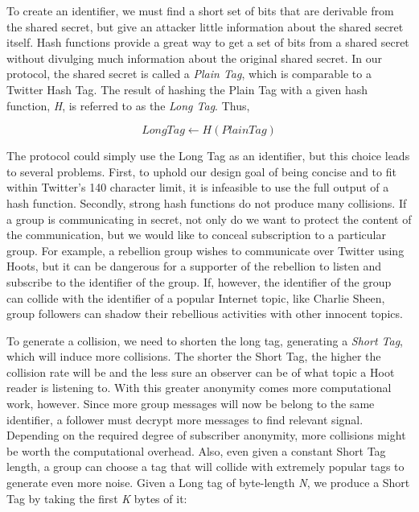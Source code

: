 \documentclass{acm_proc_article-sp}
\begin{document}
To create an identifier, we must find a short set of bits that are derivable from the shared secret, but give an attacker little information about the shared secret itself. Hash functions provide a great way to get a set of bits from a shared secret without divulging much information about the original shared secret. In our protocol, the shared secret is called a \textit{Plain Tag}, which is comparable to a Twitter Hash Tag. The result of hashing the Plain Tag with a given hash function, \textit{H}, is referred to as the \textit{Long Tag}. Thus,

\begin{equation}
	LongTag \leftarrow H(PlainTag)
\end{equation} 

The protocol could simply use the Long Tag as an identifier, but this choice leads to several problems. First, to uphold our design goal of being concise and to fit within Twitter's 140 character limit, it is infeasible to use the full output of a hash function. Secondly, strong hash functions do not produce many collisions. If a group is communicating in secret, not only do we want to protect the content of the communication, but we would like to conceal subscription to a particular group. For example, a rebellion group wishes to communicate over Twitter using Hoots, but it can be dangerous for a supporter of the rebellion to listen and subscribe to the identifier of the group. If, however, the identifier of the group can collide with the identifier of a popular Internet topic, like Charlie Sheen, group followers can shadow their rebellious activities 
with other innocent topics. 

To generate a collision, we need to shorten the long tag, generating a \textit{Short Tag}, which will induce more collisions. The shorter the Short Tag, the higher the collision rate will be and the less sure an observer can be of what topic a Hoot reader is listening to. With this greater anonymity comes more computational work, however. Since more group messages will now be belong to the same identifier, a follower must decrypt more messages to find relevant signal. Depending on the required degree of subscriber anonymity, more collisions might be worth the computational overhead. Also, even given a constant Short Tag length, a group can choose a tag that will collide with extremely popular tags to generate even more noise. Given a Long tag of byte-length \textit{N}, we produce a Short Tag by taking the first \textit{K} bytes of it:
\end{document}
